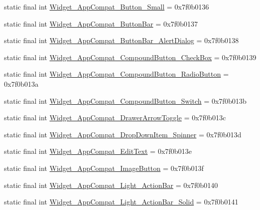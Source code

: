 \begin{CompactItemize}
\item 
static final int \hyperlink{classandroid_1_1support_1_1v7_1_1cardview_1_1_r_1_1style_856b1311ab445b3dd747228700532fc1}{Widget\_\-AppCompat\_\-Button\_\-Small} = 0x7f0b0136
\item 
static final int \hyperlink{classandroid_1_1support_1_1v7_1_1cardview_1_1_r_1_1style_7c9d370c20ca4c58193dfd7c13ecd40f}{Widget\_\-AppCompat\_\-ButtonBar} = 0x7f0b0137
\item 
static final int \hyperlink{classandroid_1_1support_1_1v7_1_1cardview_1_1_r_1_1style_31fbef05faa04868ca89e5facc86c57f}{Widget\_\-AppCompat\_\-ButtonBar\_\-AlertDialog} = 0x7f0b0138
\item 
static final int \hyperlink{classandroid_1_1support_1_1v7_1_1cardview_1_1_r_1_1style_038ba19ea107af9720fcf8c3106700f6}{Widget\_\-AppCompat\_\-CompoundButton\_\-CheckBox} = 0x7f0b0139
\item 
static final int \hyperlink{classandroid_1_1support_1_1v7_1_1cardview_1_1_r_1_1style_5bbc87379c1b65671601ecfc67c35bc1}{Widget\_\-AppCompat\_\-CompoundButton\_\-RadioButton} = 0x7f0b013a
\item 
static final int \hyperlink{classandroid_1_1support_1_1v7_1_1cardview_1_1_r_1_1style_a5ee7e1e6415fd4f05001c7726c93d34}{Widget\_\-AppCompat\_\-CompoundButton\_\-Switch} = 0x7f0b013b
\item 
static final int \hyperlink{classandroid_1_1support_1_1v7_1_1cardview_1_1_r_1_1style_a6f61b66c59f2a1ab660e7b654f82c9a}{Widget\_\-AppCompat\_\-DrawerArrowToggle} = 0x7f0b013c
\item 
static final int \hyperlink{classandroid_1_1support_1_1v7_1_1cardview_1_1_r_1_1style_e55d6424b09405e068a4857c4838a0e0}{Widget\_\-AppCompat\_\-DropDownItem\_\-Spinner} = 0x7f0b013d
\item 
static final int \hyperlink{classandroid_1_1support_1_1v7_1_1cardview_1_1_r_1_1style_d382027d2abfc55b4fa80222cf82a468}{Widget\_\-AppCompat\_\-EditText} = 0x7f0b013e
\item 
static final int \hyperlink{classandroid_1_1support_1_1v7_1_1cardview_1_1_r_1_1style_cfddccd366a6b835cc500c07fcb87850}{Widget\_\-AppCompat\_\-ImageButton} = 0x7f0b013f
\item 
static final int \hyperlink{classandroid_1_1support_1_1v7_1_1cardview_1_1_r_1_1style_03037390bbf6ec43930e384e79137e9d}{Widget\_\-AppCompat\_\-Light\_\-ActionBar} = 0x7f0b0140
\item 
static final int \hyperlink{classandroid_1_1support_1_1v7_1_1cardview_1_1_r_1_1style_ce90f3aa6b7f22aa9d76531839276823}{Widget\_\-AppCompat\_\-Light\_\-ActionBar\_\-Solid} = 0x7f0b0141

\end{CompactItemize}
